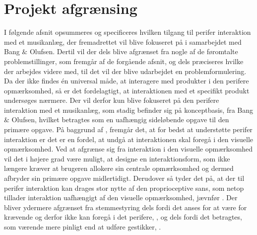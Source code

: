 \section{Projekt afgrænsing}
\label{Afgraensning}
%
I følgende afsnit opsummeres og specificeres hvilken tilgang til perifer interaktion med et musikanlæg, der fremadrettet vil blive fokuseret på i samarbejdet med Bang $\&$ Olufsen. Dertil vil der dels blive afgrænset fra nogle af de føromtalte problemstillinger, som fremgår af de forgående afsnit, og dels præciseres hvilke der arbejdes videre med, til det vil der blive udarbejdet en problemformulering.\blankline
% 
Da der ikke findes én universal måde, at interagere med produkter i den perifere opmærksomhed, så er det fordelagtigt, at interaktionen med et specifikt produkt undersøges nærmere. Der vil derfor kun blive fokuseret på den perifere interaktion med et musikanlæg, som stadig befinder sig på konceptbasis, fra Bang $\&$ Olufsen, hvilket betragtes som en uafhængig sideløbende opgave til den primære opgave. På baggrund af , fremgår det, at for bedst at understøtte perifer interaktion er det er en fordel, at undgå at interaktionen skal foregå i den visuelle opmærksomhed. Ved at afgrænse sig fra interaktion i den visuelle opmærksomhed vil det i højere grad være muligt, at designe en interaktionsform, som ikke længere kræver at brugeren allokere sin centrale opmærksomhed og dermed afbryder sin primære opgave midlertidigt. Derudover så tyder det på, at der til perifer interaktion kan drages stor nytte af den proprioceptive sans, som netop tillader interaktion uafhængigt af den visuelle opmærksomhed, jævnfør . Der bliver ydermere afgrænset fra stemmestyring dels fordi det anses for at være for krævende og derfor ikke kan foregå i det perifere, \parencite[s. 41]{PDF:PIEmbeddingHCIMicroManageMe}, og dels fordi det betragtes, som værende mere pinligt end at udføre gestikker, \parencite[s. 4]{PDF:AnExploratoryStudy}.        


